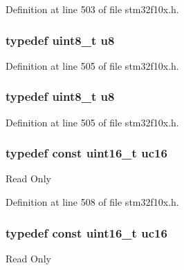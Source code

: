 Definition at line 503 of file stm32f10x.\+h.

\subsubsection[{\texorpdfstring{u8}{u8}}]{\setlength{\rightskip}{0pt plus 5cm}typedef {\bf uint8\+\_\+t} {\bf u8}}\hypertarget{group___exported__types_ga92c50087ca0e64fa93fc59402c55f8ca}{}\label{group___exported__types_ga92c50087ca0e64fa93fc59402c55f8ca}


Definition at line 505 of file stm32f10x.\+h.

\subsubsection[{\texorpdfstring{u8}{u8}}]{\setlength{\rightskip}{0pt plus 5cm}typedef {\bf uint8\+\_\+t} {\bf u8}}\hypertarget{group___exported__types_ga92c50087ca0e64fa93fc59402c55f8ca}{}\label{group___exported__types_ga92c50087ca0e64fa93fc59402c55f8ca}


Definition at line 505 of file stm32f10x.\+h.

\subsubsection[{\texorpdfstring{uc16}{uc16}}]{\setlength{\rightskip}{0pt plus 5cm}typedef const {\bf uint16\+\_\+t} {\bf uc16}}\hypertarget{group___exported__types_gabc715ea3779494b5a4f53173a397f7cb}{}\label{group___exported__types_gabc715ea3779494b5a4f53173a397f7cb}
Read Only 

Definition at line 508 of file stm32f10x.\+h.

\subsubsection[{\texorpdfstring{uc16}{uc16}}]{\setlength{\rightskip}{0pt plus 5cm}typedef const {\bf uint16\+\_\+t} {\bf uc16}}\hypertarget{group___exported__types_gabc715ea3779494b5a4f53173a397f7cb}{}\label{group___exported__types_gabc715ea3779494b5a4f53173a397f7cb}
Read Only 

